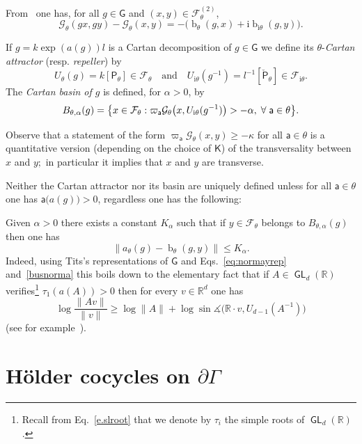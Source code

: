 \documentclass[AHL,Unicode,longabstracts,MathTools]{cedram}
\DeclareMathOperator{\bus}{b}
\newcommand{\ii}{\mathrm{i}}
\newcommand{\cartan}{a}
\DeclareMathOperator{\GL}{{\mathsf{GL}}}
\renewcommand{\sf}[1]{{\mathsf{#1}}}
\newcommand{\sroot}{{\sf{a}}}
\newcommand{\sfG}{\sf{G}}
\newcommand{\G}{\sf{\Gamma}}
\newcommand{\cal}{\mathcal}
\newcommand{\Gr}{\cal{G}}
\newcommand{\posgen}{\cal{F}^{(2)}}
\newcommand{\calF}{\mathcal{F}}
\newcommand{\R}{\mathbb{R}}
\newcommand{\RR}{\R}
\renewcommand{\t}{\theta}
\newcommand{\bord}{\partial}
\newcommand{\peso}{\varpi}
\newcommand{\slroot}{{\tau}}
\renewcommand{\/}{\backslash}
\renewcommand{\angle}{\measuredangle}
\newcommand{\<}{\langle}
\renewcommand{\>}{\rangle}
\let\originalleft\left
\let\originalright\right
\renewcommand{\left}{\mathopen{}\mathclose\bgroup\originalleft}
\renewcommand{\right}{\aftergroup\egroup\originalright}
\let\oldforall\forall
\renewcommand*{\forall}{\mathrel{\oldforall}}
\begin{document}
From~\cite[Lemma~4.12]{orbitalcounting} one has, for all $g\in\sfG$ and $(x,y)\in\posgen_\t$,
\begin{equation}\label{forGr}
\Gr_\t(gx,gy)-\Gr_\t(x,y)=-\big(\bus_\t(g,x)+\ii\bus_{\ii\t}(g,y)\big).
\end{equation}



If $g=k\exp(\cartan(g))l$ is a Cartan decomposition of $g\in\sfG$ we define its $\t$-\emph{Cartan attractor} (resp. \emph{repeller}) by
\[
U_\t(g)=k[\sf P_\t]\in\calF_\t\quad\text{and}\quad U_{\ii\t}(g^{-1})=l^{-1}[\check{\sf P}_\t]\in\calF_{\ii\t}.
\]
The \emph{Cartan basin of $g$} is defined, for $\alpha>0$, by
\begin{equation}\label{e.CartBasin}
B_{\t,\alpha}(g)= \left\{x\in\calF_\t:\peso_\sroot \Gr_\t\left(x,U_{\ii\t}(g^{-1})\right)>-\alpha,\; \forall \sroot\in\theta\right\}.
\end{equation}

\begin{rema}\label{fty}
Observe that a statement of the form $\peso_\sroot\Gr_\t(x,y) \geq-\kappa$ for all $\sroot\in\t$ is a quantitative version (depending on the choice of $\sf K$) of the transversality between $x$ and $y;$ in particular it implies that $x$ and $y$ are transverse.
\end{rema}

Neither the Cartan attractor nor its basin are uniquely defined unless for all $\sroot\in\t$ one has $\sroot\big(\cartan(g)\big)>0$, regardless one has the following:

\begin{rema}
Given $\alpha>0$ there exists a constant $K_\alpha$ such that if $y\in\calF_{\t}$ belongs to $B_{\t,\alpha}(g)$ then one has
\begin{equation}\label{comparision-shadow}
\big\|\cartan_\t(g)-\bus_\t(g,y)\big\|\leq K_\alpha.
\end{equation}
Indeed, using Tits's representations of $\sfG$ and Eqs.~\eqref{eq:normayrep} and~\eqref{busnorma} this boils down to the elementary fact that if $A\in\GL_d(\R)$ verifies\footnote{Recall from Eq.~\eqref{e.slroot} that we denote by $\slroot_i$ the simple roots of $\GL_d(\RR)$.} $\slroot_1(\cartan(A))>0$ then for every $v\in\R^d$ one has
\[
\log\frac{\|Av\|}{\|v\|}\geq \log\|A\|+\log\sin\angle\big(\R\cdot v,U_{d-1}(A^{-1})\big)
\]
(see for example~\cite[Lemma~A.3]{BPS}).
\end{rema}



\section{H\"older cocycles on \texorpdfstring{$\bord\G$}{bord G}}\label{cocycles}
\end{document}
